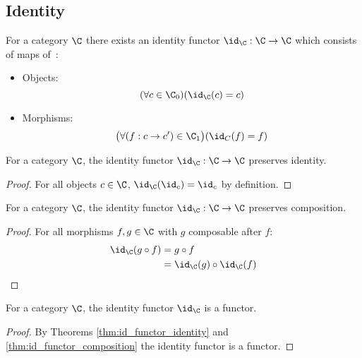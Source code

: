 \subsection{Identity}

\begin{definition}\label{def:id_functor}
  For a category $\C$ there exists an identity functor $\id_\C: \C \to \C$ which
  consists of maps of~\parencite[p.~27]{adamek_herrlich_strecker:joy_cats}:
  \begin{itemize}
    \item Objects:
      \[(\forall c \in \C_0)
        (\id_\C(c) = c)\]
    \item Morphisms:
      \[\big(\forall (f: c\to c') \in \C_1\big)
        (\id_C(f) = f)\]
  \end{itemize}
\end{definition}

\begin{theorem}
  For a category $\C$, the identity functor $\id_\C: \C \to \C$ preserves
  identity.

  \begin{proof}
    For all objects $c\in \C$, $\id_\C(\id_c) = \id_c$ by definition.
  \end{proof}
\end{theorem}

\begin{theorem}\label{thm:id_functor_composition}

  For a category $\C$, the identity functor $\id_\C: \C \to \C$ preserves
  composition.

  \begin{proof}
    For all morphisms $f,g\in \C$ with $g$ composable after $f$:
    \[
      \begin{aligned}
        \id_\C(g\circ f)
        &= g\circ f\\
        &= \id_\C(g) \circ \id_\C(f)
      \end{aligned}
    \]
  \end{proof}
\end{theorem}

\begin{theorem}[$\id_\C$ is a Functor]
  For a category $\C$, the identity functor $\id_\C$ is a functor.

  \begin{proof}
    By Theorems \ref{thm:id_functor_identity} and
    \ref{thm:id_functor_composition} the identity functor is a functor.
  \end{proof}
\end{theorem}